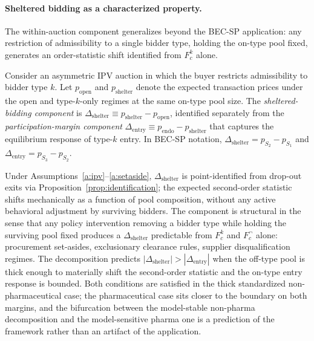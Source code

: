 \paragraph{Sheltered bidding as a characterized property.} The within-auction component generalizes beyond the BEC-SP application: any restriction of admissibility to a single bidder type, holding the on-type pool fixed, generates an order-statistic shift identified from $F_c^k$ alone.

\begin{definition}\label{def:sheltered}
Consider an asymmetric IPV auction in which the buyer restricts admissibility to bidder type $k$. Let $p_{\text{open}}$ and $p_{\text{shelter}}$ denote the expected transaction prices under the open and type-$k$-only regimes at the same on-type pool size. The \emph{sheltered-bidding component} is $\Delta_{\text{shelter}} \equiv p_{\text{shelter}} - p_{\text{open}}$, identified separately from the \emph{participation-margin component} $\Delta_{\text{entry}} \equiv p_{\text{endo}} - p_{\text{shelter}}$ that captures the equilibrium response of type-$k$ entry. In BEC-SP notation, $\Delta_{\text{shelter}} = p_{S_2} - p_{S_1}$ and $\Delta_{\text{entry}} = p_{S_3} - p_{S_2}$.
\end{definition}

Under Assumptions~\ref{a:ipv}--\ref{a:setaside}, $\Delta_{\text{shelter}}$ is point-identified from drop-out exits via Proposition~\ref{prop:identification}; the expected second-order statistic shifts mechanically as a function of pool composition, without any active behavioral adjustment by surviving bidders. The component is structural in the sense that any policy intervention removing a bidder type while holding the surviving pool fixed produces a $\Delta_{\text{shelter}}$ predictable from $F_c^k$ and $F_c^{\neg}$ alone: procurement set-asides, exclusionary clearance rules, supplier disqualification regimes. The decomposition predicts $|\Delta_{\text{shelter}}| > |\Delta_{\text{entry}}|$ when the off-type pool is thick enough to materially shift the second-order statistic and the on-type entry response is bounded. Both conditions are satisfied in the thick standardized non-pharmaceutical case; the pharmaceutical case sits closer to the boundary on both margins, and the bifurcation between the model-stable non-pharma decomposition and the model-sensitive pharma one is a prediction of the framework rather than an artifact of the application.
